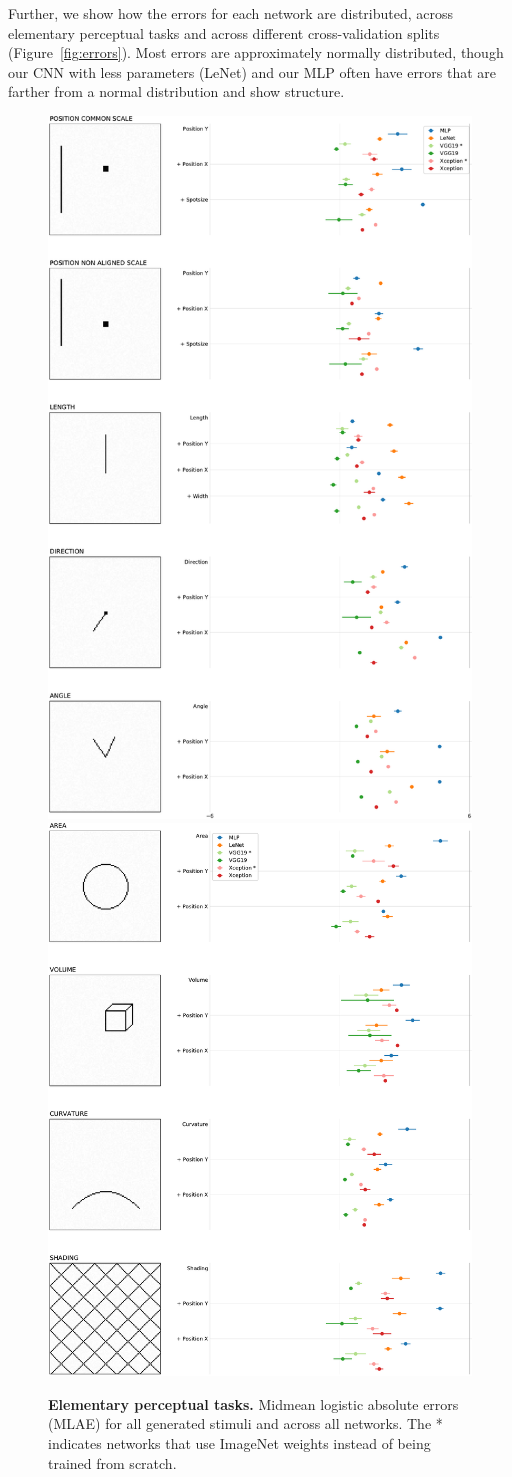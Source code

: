 \documentclass[journal]{vgtc}        %
\begin{document}
Further, we show how the errors for each network are distributed, across elementary perceptual tasks and across different cross-validation splits (Figure~\ref{fig:errors}). Most errors are approximately normally distributed, though our CNN with less parameters (LeNet) and our MLP often have errors that are farther from a normal distribution and show structure.


%

%
%
%




\begin{figure}[tbhp]
	\centering
		\includegraphics[width=.48\linewidth]{../gfx/figure1_slim_left.pdf}
	  \includegraphics[width=.48\linewidth]{../gfx/figure1_slim_right.pdf}
  \caption{\textbf{Elementary perceptual tasks.} Midmean logistic absolute errors (MLAE) for all generated stimuli and across all networks. The * indicates networks that use ImageNet weights instead of being trained from scratch.}
	\label{fig:epc_mlae}
\end{figure}
\end{document}
